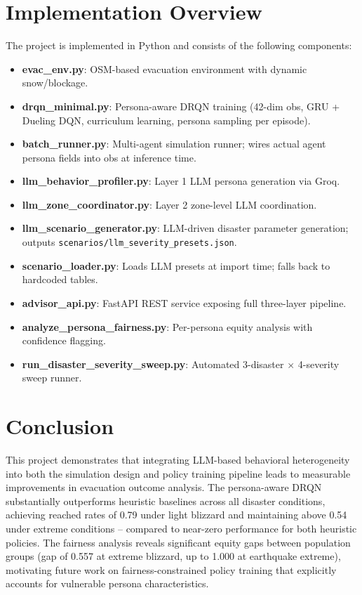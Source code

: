 \documentclass[11pt]{article}
\begin{document}
\section{Implementation Overview}

The project is implemented in Python and consists of the following components:

\begin{itemize}
  \item \textbf{evac\_env.py}: OSM-based evacuation environment with dynamic snow/blockage.
  \item \textbf{drqn\_minimal.py}: Persona-aware DRQN training (42-dim obs, GRU + Dueling DQN, curriculum learning, persona sampling per episode).
  \item \textbf{batch\_runner.py}: Multi-agent simulation runner; wires actual agent persona fields into obs at inference time.
  \item \textbf{llm\_behavior\_profiler.py}: Layer 1 LLM persona generation via Groq.
  \item \textbf{llm\_zone\_coordinator.py}: Layer 2 zone-level LLM coordination.
  \item \textbf{llm\_scenario\_generator.py}: LLM-driven disaster parameter generation; outputs \texttt{scenarios/llm\_severity\_presets.json}.
  \item \textbf{scenario\_loader.py}: Loads LLM presets at import time; falls back to hardcoded tables.
  \item \textbf{advisor\_api.py}: FastAPI REST service exposing full three-layer pipeline.
  \item \textbf{analyze\_persona\_fairness.py}: Per-persona equity analysis with confidence flagging.
  \item \textbf{run\_disaster\_severity\_sweep.py}: Automated 3-disaster $\times$ 4-severity sweep runner.
\end{itemize}

\section{Conclusion}

This project demonstrates that integrating LLM-based behavioral heterogeneity into both the simulation design and policy training pipeline leads to measurable improvements in evacuation outcome analysis. The persona-aware DRQN substantially outperforms heuristic baselines across all disaster conditions, achieving reached rates of 0.79 under light blizzard and maintaining above 0.54 under extreme conditions -- compared to near-zero performance for both heuristic policies. The fairness analysis reveals significant equity gaps between population groups (gap of 0.557 at extreme blizzard, up to 1.000 at earthquake extreme), motivating future work on fairness-constrained policy training that explicitly accounts for vulnerable persona characteristics.
\end{document}
